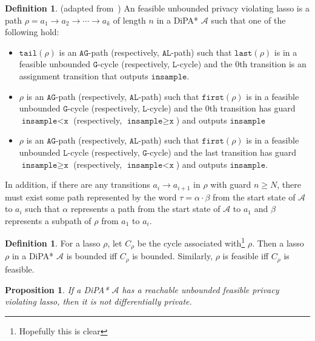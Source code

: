 \documentclass[12pt]{article}
\newcommand{\gguard}{\texttt{insample}\geq \texttt{x}}
\newcommand{\lguard}{\texttt{insample} < \texttt{x}}
\newtheorem{prop}[thm]{Proposition}
\theoremstyle{definition}
\newtheorem{defn}[thm]{Definition}
\begin{document}
\begin{defn} (adapted from~\cite{chadhaLinearTimeDecidability2021})
	An feasible unbounded privacy violating lasso is a path $\rho = a_1\to a_2\to \cdots\to a_k$ of length $n$ in a DiPA* $\mathcal{A}$ such that one of the following hold:

	\begin{itemize}
		\item $\texttt{tail}(\rho)$ is an $\texttt{AG}$-path (respectively, $\texttt{AL}$-path) such that $\texttt{last}(\rho)$ is in a feasible unbounded $\texttt{G}$-cycle (respectively, $\texttt{L}$-cycle) and the 0th transition is an assignment transition that outputs $\texttt{insample}$.
		\item $\rho$ is an $\texttt{AG}$-path (respectively, $\texttt{AL}$-path) such that $\texttt{first}(\rho)$ is in a feasible unbounded $\texttt{G}$-cycle (respectively, $\texttt{L}$-cycle) and the 0th transition has guard $\lguard$ (respectively, $\gguard$) and outputs $\texttt{insample}$ 
		\item $\rho$ is an $\texttt{AG}$-path (respectively, $\texttt{AL}$-path) such that $\texttt{first}(\rho)$ is in a feasible unbounded $\texttt{L}$-cycle (respectively, $\texttt{G}$-cycle) and the last transition has guard $\gguard$ (respectively, $\lguard$) and outputs $\texttt{insample}$.
	\end{itemize}

	In addition, if there are any transitions $a_i\to a_{i+1}$ in $\rho$ with guard $n\geq N$, there must exist some path represented by the word $\tau = \alpha \cdot \beta$ from the start state of $\mathcal{A}$ to $a_i$ such that $\alpha$ represents a path from the start state of $\mathcal{A}$ to $a_1$ and $\beta$ represents a subpath of $\rho$ from $a_1$ to $a_i$.

\end{defn}

\begin{defn}
For a lasso $\rho$, let $C_\rho$ be the cycle associated with\footnote{Hopefully this is clear} $\rho$. Then a lasso $\rho$ in a DiPA* $\mathcal{A}$ is bounded iff $C_\rho$ is bounded. Similarly, $\rho$ is feasible iff $C_\rho$ is feasible.
\end{defn}

\begin{prop}
	If a DiPA* $\mathcal{A}$ has a reachable unbounded feasible privacy violating lasso, then it is not differentially private.
\end{prop}
\end{document}
